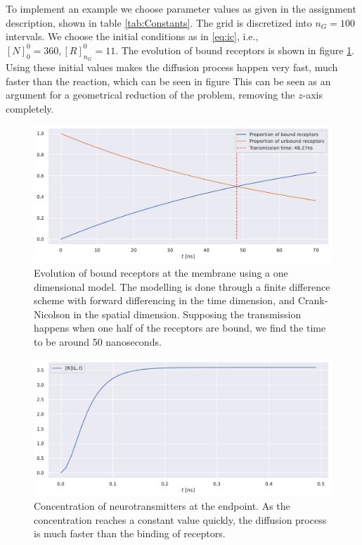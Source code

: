 \documentclass{article}
\begin{document}
To implement an example we choose parameter values as given in the assignment description, shown in table \ref{tab:Constants}.
The grid is discretized into $n_G = 100$ intervals.
We choose the initial conditions as in \eqref{eq:ic}, i.e., $[N]_0^0 = 360, [R]_{n_G}^0 = 11$.
The evolution of bound receptors is shown in figure \ref{fig:receptors}.
Using these initial values makes the diffusion process happen very fast, much faster than the reaction, which can be seen in figure 
This can be seen as an argument for a geometrical reduction of the problem, removing the $z$-axis completely.

\begin{figure}[tb]
        \centering
        \includegraphics[width=0.5\linewidth]{./code/figures/receptors.pdf}
        \caption{Evolution of bound receptors at the membrane using a one dimensional model. 
                The modelling is done through a finite difference scheme with forward differencing in the time dimension, and Crank-Nicolson in the spatial dimension. 
                Supposing the transmission happens when one half of the receptors are bound, we find the time to be around 50 nanoseconds.
        }
        \label{fig:receptors}
\end{figure}
\begin{figure}[tb]
        \centering
        \includegraphics[width=0.5\linewidth]{./code/figures/neurotransmitters.pdf}
        \caption{Concentration of neurotransmitters at the endpoint.
        As the concentration reaches a constant value quickly, the diffusion process is much faster than the binding of receptors.}
        \label{fig:neurotrans}
\end{figure}



\end{document}
